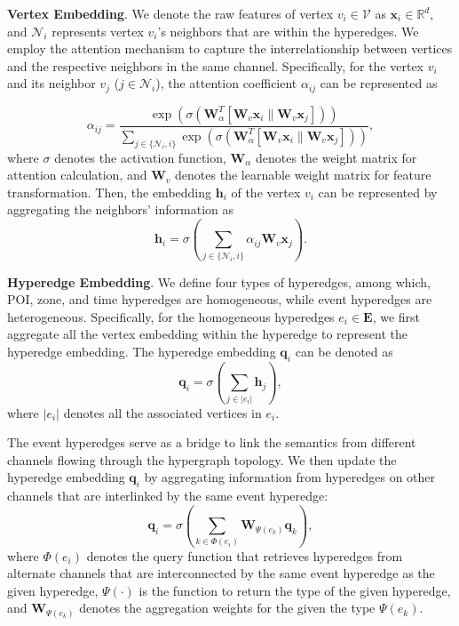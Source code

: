 \documentclass[letterpaper]{article} %
\begin{document}
\noindent\textbf{Vertex Embedding}.   
We denote the raw features of vertex $v_i \in \mathcal{V}$ as $\mathbf{x}_i \in \mathbb{R}^d$, and $\mathcal{N}_i$ represents vertex $v_i$'s neighbors that are within the hyperedges. 
We employ the attention mechanism to capture the interrelationship between vertices and the respective neighbors in the same channel. 
Specifically, for the vertex $v_i$ and its neighbor $v_j$ ($j \in \mathcal{N}_i$), the attention coefficient $\alpha_{ij}$ can be represented as  


\begin{equation}
\alpha_{ij} = \frac{\exp(\sigma(\mathbf{W}_{\alpha}^T[\mathbf{W}_v \mathbf{x}_i \| \mathbf{W}_v \mathbf{x}_j]))}{\sum_{j \in \{\mathcal{N}_i, i \}}\exp(\sigma( \mathbf{W}_{\alpha}^T[\mathbf{W}_v \mathbf{x}_i \| \mathbf{W}_v \mathbf{x}_j]))}, 
\end{equation}
where $\sigma$ denotes the activation function,  $\mathbf{W}_{\alpha}$ denotes the weight matrix for attention calculation, and $\mathbf{W}_v$ denotes the learnable weight matrix for feature transformation. 
Then, the embedding $\mathbf{h}_i$ of the vertex $v_i$ can be represented by aggregating the neighbors' information as
\begin{equation}
\mathbf{h}_i = \sigma \left( \sum_{j \in \{\mathcal{N}_i, i   \} } \alpha_{ij} \mathbf{W}_v \mathbf{x}_j \right).
\end{equation}





\noindent\textbf{Hyperedge Embedding}. 
We define four types of hyperedges, 
among which, POI, zone, and time hyperedges are homogeneous, while event hyperedges are heterogeneous. 
Specifically, for the homogeneous hyperedges $e_i \in \mathbf{E}$, we first aggregate all the vertex embedding within the hyperedge to represent the hyperedge embedding. 
The hyperedge embedding  $\mathbf{q}_i$ can be denoted as 
    \begin{equation}
    \mathbf{q}_i = \sigma \left(\sum_{j \in |e_i|} \mathbf{h}_j \right), 
    \end{equation}
where $|e_i|$ denotes all the associated vertices in $e_i$.

The event hyperedges serve as a bridge to link the semantics from different channels flowing through the hypergraph topology. 
We then update the hyperedge embedding $\mathbf{q}_i$ by aggregating information from hyperedges on other channels that are interlinked by the same event hyperedge:
\begin{equation}
    \mathbf{q}_i = \sigma \left( \sum_{k \in \Phi(e_i)} \mathbf{W}_{\Psi(e_k)} \mathbf{q}_k \right),
    \end{equation}
where $\Phi(e_i)$ denotes the query function that retrieves hyperedges from alternate channels that are interconnected by the same event hyperedge as the given hyperedge, $\Psi(\cdot)$ is the function to return the type of the given hyperedge,  and $\mathbf{W}_{\Psi(e_k)}$ denotes the aggregation weights for the given the type $\Psi(e_k)$.
\end{document}
